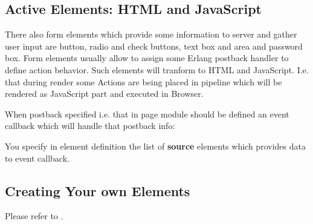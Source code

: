 \documentclass[11pt]{article}
\begin{document}

\subsection*{Active Elements: HTML and JavaScript}
There also form elements which provide some information to server
and gather user input are button, radio and check buttons, text box and area and password box.
Form elements usually allow to assign some Erlang postback handler to define action behavior.
Such elements will tranform to HTML and JavaScript. I.e. that during render some
Actions are being placed in pipeline which will be rendered as JavaScript part and executed in Browser.


When postback specified i.e. that in page module should be defined an event
callback which will handle that postback info:


You specify in element definition the list of {\bf source} elements which provides data to event callback.

\subsection*{Creating Your own Elements}
Please refer to .







\end{document}
